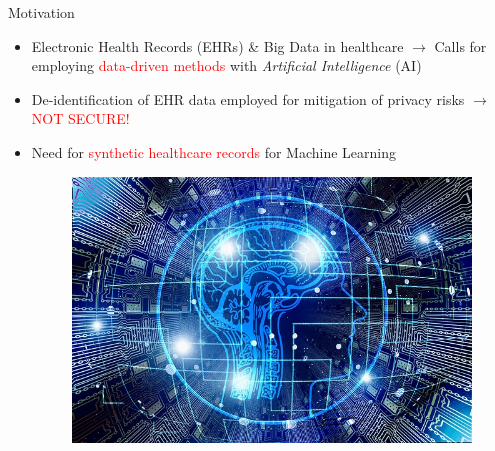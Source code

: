 \documentclass{beamer}
\begin{document}
\begin{frame}{Motivation}

\begin{itemize}
  \item Electronic Health Records (EHRs) \& Big Data in healthcare $\rightarrow$ Calls for employing \textcolor{red}{data-driven methods} with \textit{Artificial Intelligence} (AI)
  \item De-identification of EHR data employed for mitigation of privacy risks $\rightarrow$ \textcolor{red}{NOT SECURE!}~\cite{janmey2018re,scaiano2018re,baker2018method}
  \item Need for \textcolor{red}{synthetic healthcare records} for Machine Learning
  
   \begin{figure}
\includegraphics[scale=1.0]{_img/artificial-intelligence-3382507_640.jpg}
\end{figure}
\vskip 1cm
  
  
\end{itemize}

\end{frame}
\end{document}
